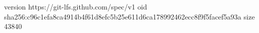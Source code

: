version https://git-lfs.github.com/spec/v1
oid sha256:c96c1efa8ca4914b4f61d8efc5b25e611d6ca178992462ecc8f9f5facef5a93a
size 43840
